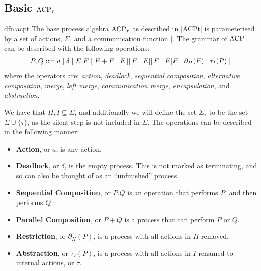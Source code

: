 \documentclass[../hons_project.tex]{subfiles}
\begin{document}
\subsection{Basic \texorpdfstring{$\mathrm{ACP}_{\tau}$}{acpt}}
\begin{dfn}{dfn:acpt}{}
   The base process algebra $\mathrm{ACP}_{\tau}$ as described in [ACPt] is parameterised by a set of actions, $\Sigma$, and a communication function $|$. The grammar of $\mathrm{ACP}$ can be described with the following operations:
   \begin{align*}
      P, Q ::= a \mid \delta \mid E . F \mid E + F \mid E \merge F \mid E \leftmerge F \mid E | F \mid \restrict(E) \mid \tau_{I}(P) \mid
   \end{align*}
   where the operators are: \textit{action}, \textit{deadlock}, \textit{sequential composition}, \textit{alternative composition},  \textit{merge}, \textit{left merge}, \textit{communication merge}, \textit{encapsulation}, and \textit{abstraction}.
\end{dfn}
We have that $H, I \subseteq \Sigma$, and additionally we will define the set $\Sigma_{\tau}$ to be the set $\Sigma \cup \{\tau\}$, as the silent step is not included in $\Sigma$. The operations can be described in the following manner:



\begin{itemize}
   \item \textbf{Action}, or $a$, is any action.
   \item \textbf{Deadlock}, or $\delta$, is the empty process. This is not marked as terminating, and so can also be thought of as an ``unfinished'' process
   \item \textbf{Sequential Composition}, or $P . Q$ is an operation that performs $P$, and then performs $Q$.
   \item \textbf{Parallel Composition}, or $P + Q$ is a process that can perform $P$ or $Q$. 
   \item \textbf{Restriction}, or $\partial_{H}(P)$, is a process with all actions in $H$ removed.
   \item \textbf{Abstraction}, or $\tau_{I}(P)$, is a process with all actions in $I$ renamed to internal actions, or $\tau$.
\end{itemize}
\end{document}
